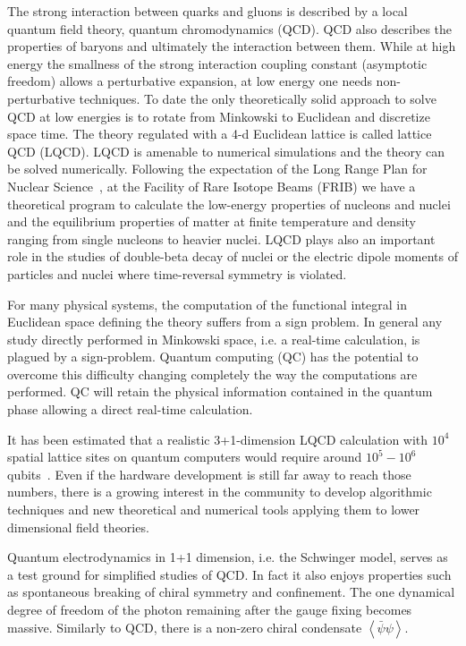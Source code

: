 \documentclass[11pt]{article}
\begin{document}
The strong interaction between quarks and gluons is
described by a local quantum field theory, quantum chromodynamics (QCD).
QCD also describes the properties of baryons and ultimately the interaction between them.
While at high energy the smallness of the
strong interaction coupling constant (asymptotic freedom) allows a perturbative
expansion, at low energy one needs non-perturbative techniques.
To date the only theoretically solid approach to solve QCD at low energies
is to rotate from Minkowski to Euclidean and discretize space time.
The theory regulated with a 4-d Euclidean lattice is called lattice QCD (LQCD).
LQCD is amenable to numerical simulations and the theory can be solved numerically.
Following the expectation of the Long Range Plan for Nuclear Science~\cite{Geesaman:2015fha},
at the Facility of Rare Isotope Beams (FRIB) we have a theoretical program
to calculate the low-energy properties of nucleons and nuclei and the equilibrium properties
of matter at finite temperature and density ranging from single nucleons to heavier nuclei.
LQCD plays also an important role in the studies of double-beta decay of nuclei
or the electric dipole moments of particles and nuclei
where time-reversal symmetry is violated.

For many physical systems, the computation of the
functional integral in Euclidean space defining the theory
suffers from a sign problem. In general any study directly
performed in Minkowski space, i.e. a real-time calculation,
is plagued by a sign-problem.
Quantum computing (QC) has the potential to overcome this difficulty
changing completely the way the computations are performed.
QC will retain the physical information contained in the quantum phase
allowing a direct real-time calculation.

It has been estimated that a realistic 3+1-dimension LQCD calculation with $10^4$ spatial lattice sites on quantum computers
would require around $10^5 - 10^6$ qubits~\cite{Byrnes:2005qx}. 
Even if the hardware development is still
far away to reach those numbers, there is a growing interest in the community
to develop algorithmic techniques and new theoretical and numerical tools applying them
to lower dimensional field theories.

Quantum electrodynamics in 1+1 dimension, i.e. the Schwinger model,
serves as a test ground for simplified studies of QCD.
In fact it also enjoys properties such as
spontaneous breaking of chiral symmetry and confinement.
The one dynamical degree of freedom of the photon remaining
after the gauge fixing becomes massive.
Similarly to QCD, there is a non-zero
chiral condensate $\left\langle \bar\psi \psi \right\rangle$.
\end{document}
